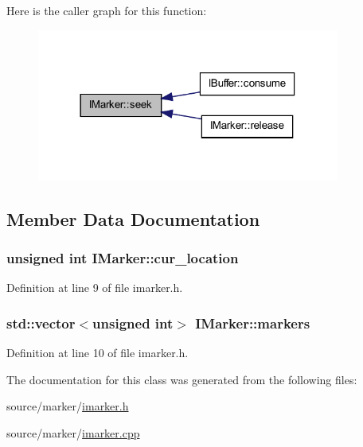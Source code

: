 Here is the caller graph for this function:\nopagebreak
\begin{figure}[H]
\begin{center}
\leavevmode
\includegraphics[width=282pt]{class_i_marker_a58086bbf091c5b49c15464a070fec171_icgraph}
\end{center}
\end{figure}




\subsection{Member Data Documentation}
\hypertarget{class_i_marker_adedaefcf6a1b1eac3d728a9d318dc618}{
\subsubsection[{cur\_\-location}]{\setlength{\rightskip}{0pt plus 5cm}unsigned int {\bf IMarker::cur\_\-location}}}
\label{class_i_marker_adedaefcf6a1b1eac3d728a9d318dc618}


Definition at line 9 of file imarker.h.

\hypertarget{class_i_marker_a1c1b6ba790e3adf5fa8d9b24c06b10d7}{
\subsubsection[{markers}]{\setlength{\rightskip}{0pt plus 5cm}std::vector$<$unsigned int$>$ {\bf IMarker::markers}}}
\label{class_i_marker_a1c1b6ba790e3adf5fa8d9b24c06b10d7}


Definition at line 10 of file imarker.h.



The documentation for this class was generated from the following files:\begin{DoxyCompactItemize}
\item 
source/marker/\hyperlink{imarker_8h}{imarker.h}\item 
source/marker/\hyperlink{imarker_8cpp}{imarker.cpp}\end{DoxyCompactItemize}
